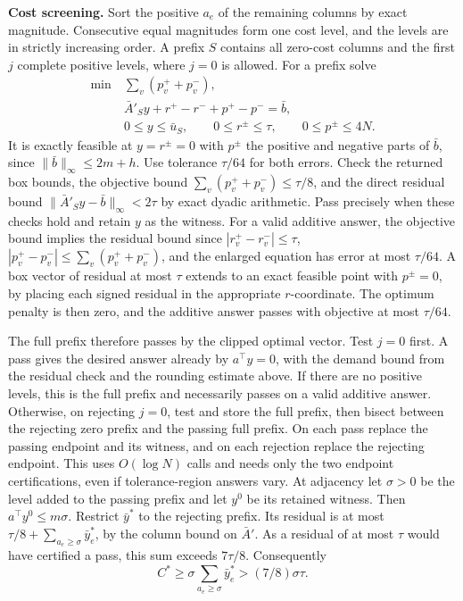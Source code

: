 \documentclass[11pt]{article}
\begin{document}
\textbf{Cost screening.} Sort the positive \(a_e\) of the remaining columns by exact magnitude. Consecutive equal magnitudes form one cost level, and the levels are in strictly increasing order. A prefix \(S\) contains all zero-cost columns and the first \(j\) complete positive levels, where \(j=0\) is allowed. For a prefix solve
\[
\begin{split}
 \min\ &\sum_v(p_v^++p_v^-),\\
 &\bar A'_S y+r^+-r^-+p^+-p^-=\bar b,\\
 &0\le y\le\bar u_S,\qquad 0\le r^\pm\le\tau,\qquad 0\le p^\pm\le4N .
\end{split}
\]
It is exactly feasible at \(y=r^\pm=0\) with \(p^\pm\) the positive and negative parts of \(\bar b\), since \(\|\bar b\|_\infty\le2m+h\). Use tolerance \(\tau/64\) for both errors. Check the returned box bounds, the objective bound \(\sum_v(p_v^++p_v^-)\le\tau/8\), and the direct residual bound \(\|\bar A'_S y-\bar b\|_\infty<2\tau\) by exact dyadic arithmetic. Pass precisely when these checks hold and retain \(y\) as the witness. For a valid additive answer, the objective bound implies the residual bound since \(|r_v^+-r_v^-|\le\tau\), \(|p_v^+-p_v^-|\le\sum_v(p_v^++p_v^-)\), and the enlarged equation has error at most \(\tau/64\). A box vector of residual at most \(\tau\) extends to an exact feasible point with \(p^\pm=0\), by placing each signed residual in the appropriate \(r\)-coordinate. The optimum penalty is then zero, and the additive answer passes with objective at most \(\tau/64\).

The full prefix therefore passes by the clipped optimal vector. Test \(j=0\) first. A pass gives the desired answer already by \(a^\top y=0\), with the demand bound from the residual check and the rounding estimate above. If there are no positive levels, this is the full prefix and necessarily passes on a valid additive answer. Otherwise, on rejecting \(j=0\), test and store the full prefix, then bisect between the rejecting zero prefix and the passing full prefix. On each pass replace the passing endpoint and its witness, and on each rejection replace the rejecting endpoint. This uses \(O(\log N)\) calls and needs only the two endpoint certifications, even if tolerance-region answers vary. At adjacency let \(\sigma>0\) be the level added to the passing prefix and let \(y^0\) be its retained witness. Then \(a^\top y^0\le m\sigma\). Restrict \(\bar y^*\) to the rejecting prefix. Its residual is at most \(\tau/8+\sum_{a_e\ge\sigma}\bar y_e^*\), by the column bound on \(\bar A'\). As a residual of at most \(\tau\) would have certified a pass, this sum exceeds \(7\tau/8\). Consequently
\[
 C^*\ge\sigma\sum_{a_e\ge\sigma}\bar y_e^*>(7/8)\sigma\tau.
\tag{1}
\]
\end{document}
